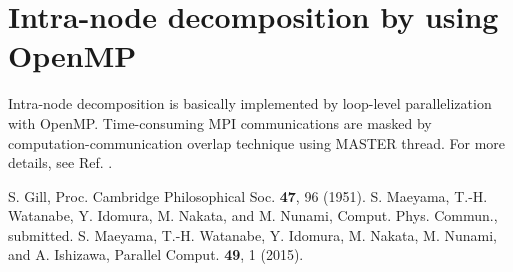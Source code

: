 \section{Intra-node decomposition by using OpenMP}
\label{sec:Intra-node decomposition by using OpenMP}
Intra-node decomposition is basically implemented by loop-level parallelization with OpenMP. Time-consuming MPI communications are masked by computation-communication overlap technique using MASTER thread. For more details, see Ref. \cite{Maeyama2015PC}.






\begin{thebibliography}{99}
  S. Gill,
  Proc. Cambridge Philosophical Soc. {\bf 47}, 96 (1951).
  S. Maeyama, T.-H. Watanabe, Y. Idomura, M. Nakata, and M. Nunami,
  Comput. Phys. Commun., submitted.
  S. Maeyama, T.-H. Watanabe, Y. Idomura, M. Nakata, M. Nunami, and A. Ishizawa,
  Parallel Comput. {\bf 49}, 1 (2015).
\end{thebibliography}
